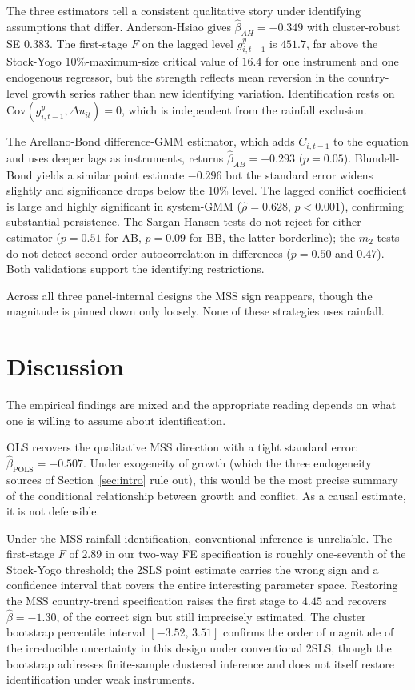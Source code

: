\documentclass[11pt,a4paper]{article}
\begin{document}
The three estimators tell a consistent qualitative story under
identifying assumptions that differ. Anderson-Hsiao gives
$\hat\beta_{AH} = -0.349$ with cluster-robust SE $0.383$. The
first-stage $F$ on the lagged level $g^{y}_{i,t-1}$ is $451.7$, far
above the Stock-Yogo 10\%-maximum-size critical value of $16.4$ for one
instrument and one endogenous regressor, but the strength reflects
mean reversion in the country-level growth series rather than new
identifying variation. Identification rests on
$\mathrm{Cov}(g^{y}_{i,t-1}, \Delta u_{it}) = 0$, which is independent
from the rainfall exclusion.

The Arellano-Bond difference-GMM estimator, which adds $C_{i,t-1}$ to
the equation and uses deeper lags as instruments, returns
$\hat\beta_{AB} = -0.293$ ($p = 0.05$). Blundell-Bond yields a similar
point estimate $-0.296$ but the standard error widens slightly and
significance drops below the 10\% level. The lagged conflict
coefficient is large and highly significant in system-GMM
($\hat\rho = 0.628$, $p < 0.001$), confirming substantial persistence.
The Sargan-Hansen tests do not reject for either estimator ($p = 0.51$
for AB, $p = 0.09$ for BB, the latter borderline); the $m_2$ tests do
not detect second-order autocorrelation in differences ($p = 0.50$ and
$0.47$). Both validations support the identifying restrictions.

Across all three panel-internal designs the MSS sign reappears,
though the magnitude is pinned down only loosely. None of these
strategies uses rainfall.

\section{Discussion}\label{sec:discussion}
The empirical findings are mixed and the appropriate reading depends
on what one is willing to assume about identification.

OLS recovers the qualitative MSS direction with a tight standard
error: $\hat\beta_{\text{POLS}} = -0.507$. Under exogeneity of growth
(which the three endogeneity sources of Section~\ref{sec:intro} rule
out), this would be the most precise summary of the conditional
relationship between growth and conflict. As a causal estimate, it is
not defensible.

Under the MSS rainfall identification, conventional inference is
unreliable. The first-stage $F$ of $2.89$ in our two-way FE
specification is roughly one-seventh of the Stock-Yogo threshold; the
2SLS point estimate carries the wrong sign and a confidence interval
that covers the entire interesting parameter space. Restoring the MSS
country-trend specification raises the first stage to $4.45$ and
recovers $\hat\beta = -1.30$, of the correct sign but still
imprecisely estimated. The cluster bootstrap percentile interval
$[-3.52,\,3.51]$ confirms the order of magnitude of the irreducible
uncertainty in this design under conventional 2SLS, though the
bootstrap addresses finite-sample clustered inference and does not
itself restore identification under weak instruments.
\end{document}
